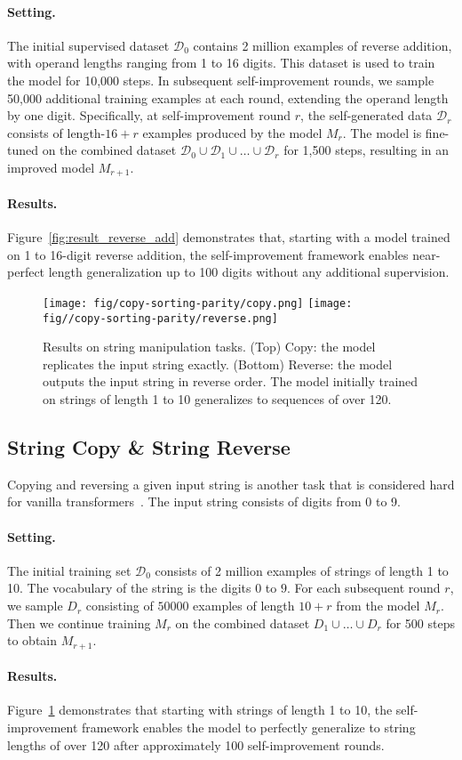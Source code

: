 \paragraph{Setting.} 
The initial supervised dataset $\mathcal{D}_0$ contains 2 million examples of reverse addition, with operand lengths ranging from 1 to 16 digits. This dataset is used to train the model for 10,000 steps. In subsequent self-improvement rounds, we sample 50,000 additional training examples at each round, extending the operand length by one digit. Specifically, at self-improvement round \( r \), the self-generated data $\mathcal{D}_r$ consists of length-\( 16+r \) examples produced by the model \( M_r \). The model is fine-tuned on the combined dataset $\mathcal{D}_0 \cup \mathcal{D}_1 \cup \dots \cup \mathcal{D}_r$ for 1,500 steps, resulting in an improved model \( M_{r+1} \).

\paragraph{Results.} Figure~\ref{fig:result_reverse_add} demonstrates that, starting with a model trained on 1 to 16-digit reverse addition, the self-improvement framework enables near-perfect length generalization up to 100 digits without any additional supervision. 

\begin{figure}
    \centering
    \texttt{[image: fig/copy-sorting-parity/copy.png]}
    \texttt{[image: fig//copy-sorting-parity/reverse.png]}
    \caption{Results on string manipulation tasks. (Top) Copy: the model replicates the input string exactly. (Bottom) Reverse: the model outputs the input string in reverse order. The model initially trained on strings of length 1 to 10 generalizes to sequences of over 120. %
    }
    \label{fig:result_copy_reverse}
\end{figure}

\subsection{String Copy \& String Reverse}\label{sec:string_copy}



Copying and reversing a given input string is another task that is considered hard for vanilla transformers~\citep{anil2022exploring,zhou2023algorithms}. The input string consists of digits from 0 to 9. 

\paragraph{Setting.} 
The initial training set $\mathcal{D_0}$ consists of 2 million examples of strings of length 1 to 10. The vocabulary of the string is the digits $0$ to $9$. For each subsequent round $r$, we sample $D_{r}$ consisting of $50000$ examples of length $10+r$ from the model $M_r$. Then we continue training $M_r$ on the combined dataset $D_1\cup\dots\cup D_r$ for 500 steps to obtain $M_{r+1}$. 

\paragraph{Results.} 
Figure~\ref{fig:result_copy_reverse} demonstrates that starting with strings of length 1 to 10, the self-improvement framework enables the model to perfectly generalize to string lengths of over 120 after approximately 100 self-improvement rounds.


